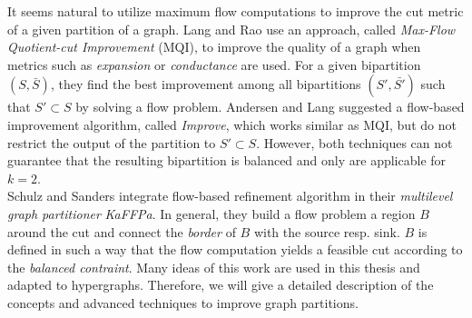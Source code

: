 It seems natural to utilize maximum flow computations to improve the cut metric of a 
given partition of a graph. Lang and Rao \cite{lang2004flow} use an approach,
called \emph{Max-Flow Quotient-cut Improvement} (MQI), to improve the quality
of a graph when metrics such as \emph{expansion} or \emph{conductance}
are used. For a given bipartition $(S,\bar{S})$, they find the best 
improvement among all bipartitions $(S',\bar{S'})$ such that $S' \subset S$
by solving a flow problem. Andersen and Lang \cite{andersen2008algorithm}
suggested a flow-based improvement algorithm, called \emph{Improve},
which works similar as MQI, but do not restrict the output of the 
partition to $S' \subset S$. However, both techniques can not guarantee 
that the resulting bipartition is balanced and only are applicable for $k=2$. \\
Schulz and Sanders \cite{sanders2011engineering} integrate flow-based refinement algorithm 
in their \emph{multilevel graph partitioner} \emph{KaFFPa}. In general,
they build a flow problem a region $B$ around the cut and connect the \emph{border} 
of $B$ with the source resp. sink. $B$ is defined in such a way that the flow computation
yields a feasible cut according to the \emph{balanced contraint}. Many ideas of this work are used in this
thesis and adapted to hypergraphs. Therefore, we will give a detailed description
of the concepts and advanced techniques to improve graph partitions.

